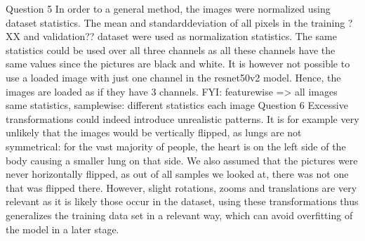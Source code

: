 \documentclass[conference]{IEEEtran}
\begin{document}
Question 5
In order to a general method, the images were normalized using dataset statistics. The mean and standarddeviation of all pixels in the training ?XX and validation?? dataset were used as normalization statistics. 
The same statistics could be used over all three channels as all these channels have the same values since the pictures are black and white. It is however not possible to use a loaded image with just one channel in the resnet50v2 model. Hence, the images are loaded as if they have 3 channels.
FYI: featurewise => all images same statistics, samplewise: different statistics each image
Question 6
Excessive transformations could indeed introduce unrealistic patterns. It is for example very unlikely that the images would be vertically flipped, as lungs are not symmetrical: for the vast majority of people, the heart is on the left side of the body causing a smaller lung on that side. 
We also assumed that the pictures were never horizontally flipped, as out of all samples we looked at, there was not one that was flipped there. However, slight rotations, zooms and translations are very relevant as it is likely those occur in the dataset, using these transformations thus generalizes the training data set in a relevant way, which can avoid overfitting of the model in a later stage.
\end{document}
